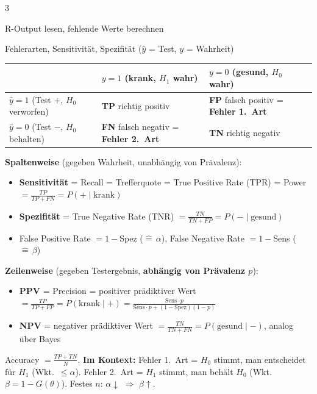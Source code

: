 \documentclass[8pt,a4paper,landscape]{extarticle}
\renewcommand{\arraystretch}{1.12}
\newcommand{\ra}{$\Rightarrow$}
\begin{document}
\begin{multicols*}{3}
\begin{werkzeug}{R-Output lesen, fehlende Werte berechnen}
\begin{itemize}
\end{itemize}
\end{werkzeug}
\begin{wissen}{Fehlerarten, Sensitivität, Spezifität ($\hat y$ = Test, $y$ = Wahrheit)}
{\renewcommand{\arraystretch}{1.25}\begin{tabularx}{\linewidth}{@{}>{\raggedright\arraybackslash}p{1.95cm}|>{\raggedright\arraybackslash}X|>{\raggedright\arraybackslash}X@{}}
 & $y=1$ (krank, $H_1$ wahr) & $y=0$ (gesund, $H_0$ wahr) \\
\hline
$\hat y=1$ (Test $+$, $H_0$ verworfen) & \textbf{TP} richtig positiv & \textbf{FP} falsch positiv = \textbf{Fehler 1.\ Art} \\
\hline
$\hat y=0$ (Test $-$, $H_0$ behalten) & \textbf{FN} falsch negativ = \textbf{Fehler 2.\ Art} & \textbf{TN} richtig negativ \\
\end{tabularx}}
\textbf{Spaltenweise} (gegeben Wahrheit, unabhängig von Prävalenz):
\begin{itemize}
\item \textbf{Sensitivität} = Recall = Trefferquote = True Positive Rate (TPR) = Power $=\frac{TP}{TP+FN}=P(+\mid\text{krank})$
\item \textbf{Spezifität} = True Negative Rate (TNR) $=\frac{TN}{TN+FP}=P(-\mid\text{gesund})$
\item False Positive Rate $=1-$Spez ($\widehat{=}\,\alpha$), False Negative Rate $=1-$Sens ($\widehat{=}\,\beta$)
\end{itemize}
\textbf{Zeilenweise} (gegeben Testergebnis, \textbf{abhängig von Prävalenz $p$}):
\begin{itemize}
\item \textbf{PPV} = Precision = positiver prädiktiver Wert $=\frac{TP}{TP+FP}=P(\text{krank}\mid +)=\frac{\text{Sens}\cdot p}{\text{Sens}\cdot p+(1-\text{Spez})(1-p)}$
\item \textbf{NPV} = negativer prädiktiver Wert $=\frac{TN}{TN+FN}=P(\text{gesund}\mid -)$, analog über Bayes
\end{itemize}
Accuracy $=\frac{TP+TN}{N}$. \textbf{Im Kontext:} Fehler 1.\ Art = $H_0$ stimmt, man entscheidet für $H_1$ (Wkt.\ $\le\alpha$). Fehler 2.\ Art = $H_1$ stimmt, man behält $H_0$ (Wkt.\ $\beta=1-G(\theta)$). Festes $n$: $\alpha\downarrow$ \ra{} $\beta\uparrow$.
\end{wissen}



\end{multicols*}
\end{document}
